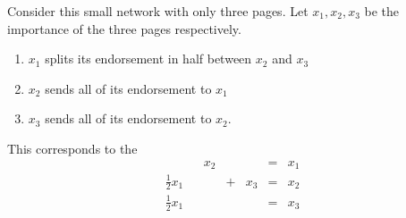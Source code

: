 \begin{applicationActivities}{5}{29}
\begin{example}
Consider this small network with only three pages.  Let $x_1, x_2, x_3$ be the importance of the three pages respectively.

\begin{multicols}{2}
\begin{center}
\end{center}

\columnbreak

\begin{enumerate}
\item $x_1$ splits its endorsement in half between $x_2$ and $x_3$
\item $x_2$ sends all of its endorsement to $x_1$
\item $x_3$ sends all of its endorsement to $x_2$.
\end{enumerate}

This corresponds to the 
\begin{alignat*}{4}
  && x_2 && &=& x_1 \\
\frac{1}{2} x_1&& &+&x_3 &=& x_2 \\
\frac{1}{2} x_1&& && &=& x_3
\end{alignat*}
\end{multicols}
\end{example}





\begin{example}
  \begin{multicols}{2}
  \begin{center}
\end{center}
\end{multicols}
\end{example}
\end{applicationActivities}
